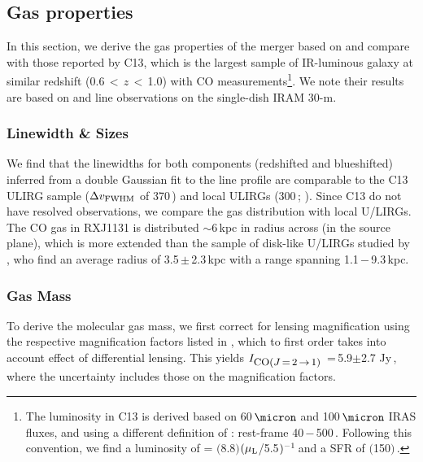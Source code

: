 \documentclass[]{emulateapj}
\begin{document}
\subsection{Gas properties} \label{sec:properties}
In this section, we derive the gas properties of the merger  
based on \bco and compare with those reported by
C13, which is the largest sample of
IR-luminous galaxy at similar redshift
(0.6\,$<$\,$z$\,$<$\,1.0) with CO measurements\footnote{The
\fir luminosity in C13 is derived based on 60\,$\micron$ and 100\,$\micron$ IRAS fluxes,
and using a different definition of
\LFIR: rest-frame 40\,$-$\,500\,\micron. Following this convention, 
we find a \fir luminosity of 
\LFIR = $($8.8$)$$(\mu_{\rm L}$/5.5$)\mbox{$^{-1}$}$\,\Lsun and
a SFR of $($150$)$\,\sfrU.}.
We note their results are based on \bco and  line observations on the single-dish
IRAM 30-m.
 
\subsubsection{Linewidth \& Sizes} %
We find that the linewidths for both components (redshifted and blueshifted)
inferred from a double Gaussian fit to the line profile are
comparable to the C13 ULIRG sample
($\Delta v_{\rm FWHM}$ of 370\,\kms) and local ULIRGs
(300\,\kms; \citealt[][]{Solomon97a}).
Since C13 do not have resolved observations, we compare the
gas distribution with local U/LIRGs. The CO gas in RXJ1131 is
distributed $\sim$6\,kpc in radius across (in
the source plane), which is more extended than the
sample of disk-like U/LIRGs studied by
\citet[hereafter U14]{Ueda14a}, %
who find an average radius of 3.5\,$\pm$\,2.3\,kpc
with a range spanning 1.1\,$-$\,9.3\,kpc.

\subsubsection{Gas Mass}
To derive the molecular gas mass, we first correct for lensing magnification
using the respective magnification factors listed in , which to
first order takes into account effect of differential lensing. This yields
$I_{\small \mbox{CO($J$\,=\,2\,$\rightarrow$\,1) }}$\,=\,5.9$\pm$2.7 Jy\,\kms,
where the uncertainty includes those on
the magnification factors.
\end{document}
